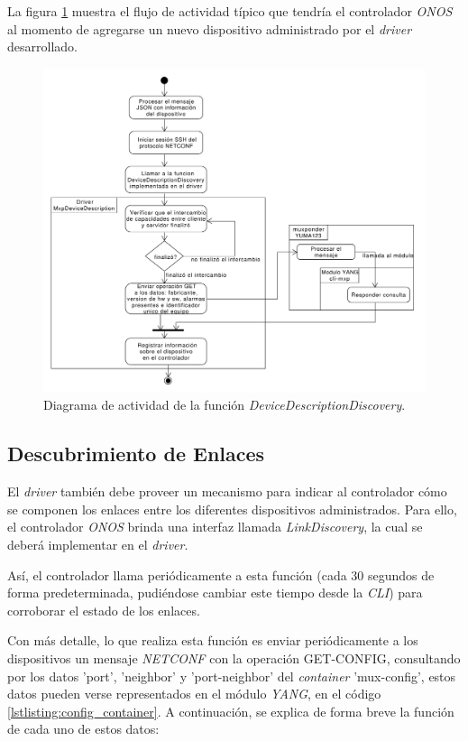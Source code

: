     La figura \ref{fig:actividad_driver_descr} muestra el flujo de actividad típico que tendría el controlador \textit{ONOS} al momento de agregarse un nuevo dispositivo administrado por el \textit{driver} desarrollado.
    
    \begin{figure}[H]
        \centering
        \includegraphics[scale=0.45]{Figures/actividad_driver_descr.pdf}
        \caption{Diagrama de actividad de la función \textit{DeviceDescriptionDiscovery}.}
        \label{fig:actividad_driver_descr}
      \end{figure}

\subsection{Descubrimiento de Enlaces} \label{driverlink}

El \textit{driver} también debe proveer un mecanismo para indicar al controlador cómo se componen los enlaces entre los diferentes dispositivos administrados. Para ello, el controlador \textit{ONOS} brinda una interfaz llamada \textit{LinkDiscovery}, la cual se deberá implementar en el \textit{driver}. 

Así, el controlador llama periódicamente a esta función (cada 30 segundos de forma predeterminada, pudiéndose cambiar este tiempo desde la \textit{CLI}) para corroborar el estado de los enlaces. 

Con más detalle, lo que realiza esta función es enviar periódicamente a los dispositivos un mensaje \textit{NETCONF} con la operación GET-CONFIG, consultando por los datos 'port', 'neighbor' y 'port-neighbor' del \textit{container} 'mux-config', estos datos pueden verse representados en el módulo \textit{YANG}, en el código \ref{lstlisting:config_container}. A continuación, se explica de forma breve la función de cada uno de estos datos:

